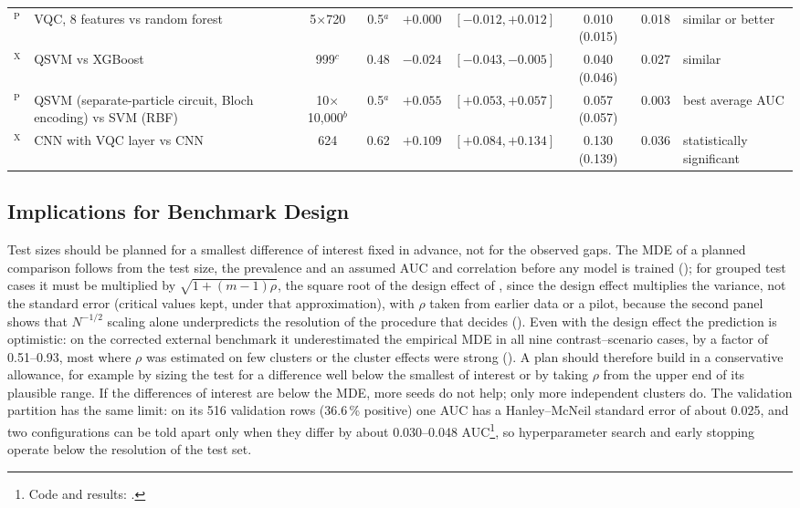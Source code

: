 \documentclass[11pt,a4paper]{article}
\begin{document}
\begin{table}[htbp]
{\begin{tabularx}{\textwidth}{@{}>{\raggedright\arraybackslash}p{2.0cm}>{\raggedright\arraybackslash}Xcccccc>{\raggedright\arraybackslash}p{1.55cm}@{}}
\citet{belis2021}$^{\mathrm{P}}$ & VQC, 8 features vs random forest & 5$\times$720 & 0.5$^{a}$ & $+0.000$ & $[-0.012,+0.012]$ & 0.010 (0.015) & 0.018 & similar or better \\
\citet{grossi2022}$^{\mathrm{X}}$ & QSVM vs XGBoost & 999$^{c}$ & 0.48 & $-0.024$ & $[-0.043,-0.005]$ & 0.040 (0.046) & 0.027 & similar \\
\citet{heredge2021}$^{\mathrm{P}}$ & QSVM (separate-particle circuit, Bloch encoding) vs SVM (RBF) & 10$\times$10{,}000$^{b}$ & 0.5$^{a}$ & $+0.055$ & $[+0.053,+0.057]$ & 0.057 (0.057) & 0.003 & best average AUC \\
\citet{kulkarni2023}$^{\mathrm{X}}$ & CNN with VQC layer vs CNN & 624 & 0.62 & $+0.109$ & $[+0.084,+0.134]$ & 0.130 (0.139) & 0.036 & statistically significant \\
\bottomrule
\end{tabularx}}
\end{table}

\subsection{Implications for Benchmark Design}
\label{sec:design_implications}

Test sizes should be planned for a smallest difference of interest fixed in advance, not for the observed gaps. The MDE of a planned comparison follows from the test size, the prevalence and an assumed AUC and correlation before any model is trained (); for grouped test cases it must be multiplied by $\sqrt{1+(m-1)\rho}$, the square root of the design effect of , since the design effect multiplies the variance, not the standard error (critical values kept, under that approximation), with $\rho$ taken from earlier data or a pilot, because the second panel shows that $N^{-1/2}$ scaling alone underpredicts the resolution of the procedure that decides (). Even with the design effect the prediction is optimistic: on the corrected external benchmark it underestimated the empirical MDE in all nine contrast--scenario cases, by a factor of 0.51--0.93, most where $\rho$ was estimated on few clusters or the cluster effects were strong (). A plan should therefore build in a conservative allowance, for example by sizing the test for a difference well below the smallest of interest or by taking $\rho$ from the upper end of its plausible range. If the differences of interest are below the MDE, more seeds do not help; only more independent clusters do. The validation partition has the same limit: on its 516 validation rows (36.6\,\% positive) one AUC has a Hanley--McNeil standard error of about 0.025, and two configurations can be told apart only when they differ by about 0.030--0.048 AUC\footnote{Code and results: .}, so hyperparameter search and early stopping operate below the resolution of the test set.
\end{document}
